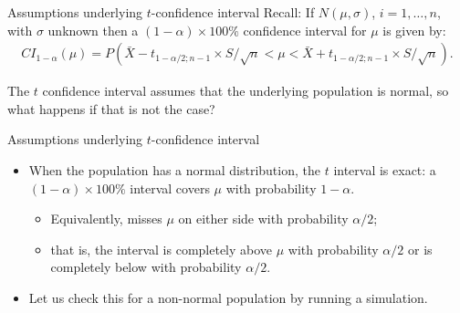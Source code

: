 \documentclass[
  ignorenonframetext,
]{beamer}
\providecommand{\tightlist}{%
  \setlength{\itemsep}{0pt}\setlength{\parskip}{0pt}}
\begin{document}
\begin{frame}{Assumptions underlying \(t\)-confidence interval}
\protect\hypertarget{assumptions-underlying-t-confidence-interval}{}
Recall: If \(N(\mu, \sigma)\), \(i=1,\ldots, n\), with \(\sigma\)
unknown then a \((1-\alpha)\times 100\%\) confidence interval for
\(\mu\) is given by: \[\begin{array}{ll}
CI_{1-\alpha}(\mu)=P\left(\bar{X}-t_{1-\alpha/2;n-1}\times S/\sqrt{n}<\mu<\bar{X}+t_{1-\alpha/2;n-1}\times S/\sqrt{n}\right).
\end{array}\]

The \(t\) confidence interval assumes that the underlying population is
normal, so what happens if that is not the case?
\end{frame}

\begin{frame}{Assumptions underlying \(t\)-confidence interval}
\protect\hypertarget{assumptions-underlying-t-confidence-interval-1}{}
\begin{itemize}
\item
  When the population has a normal distribution, the \(t\) interval is
  exact: a \((1-\alpha)\times 100\%\) interval covers \(\mu\) with
  probability \(1-\alpha\).

  \begin{itemize}
  \tightlist
  \item
    Equivalently, misses \(\mu\) on either side with probability
    \(\alpha/2\);
  \item
    that is, the interval is completely above \(\mu\) with probability
    \(\alpha/2\) or is completely below with probability \(\alpha/2\).
  \end{itemize}
\item
  Let us check this for a non-normal population by running a simulation.
\end{itemize}
\end{frame}
\end{document}
